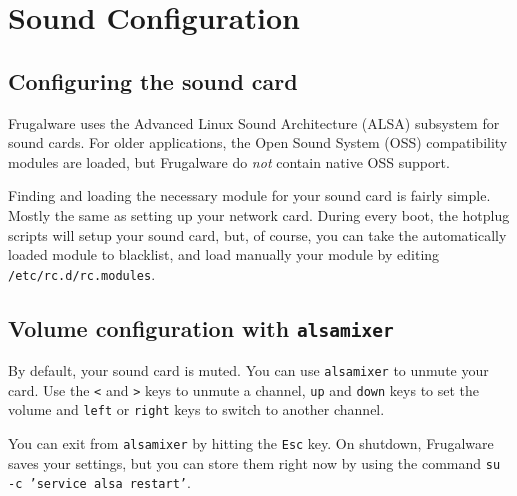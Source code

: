 \chapter{Sound Configuration}
\section{Configuring the sound card}

Frugalware uses the Advanced Linux Sound Architecture (ALSA) subsystem for sound cards. For older applications, the Open Sound System (OSS) compatibility modules are loaded, but Frugalware do \textit{not} contain native OSS support.

Finding and loading the necessary module for your sound card is fairly simple. Mostly the same as setting up your network card. During every boot, the hotplug scripts will setup your sound card, but, of course, you can take the automatically loaded module to blacklist, and load manually your module by editing {\tt /etc/rc.d/rc.modules}.

\section{Volume configuration with {\tt alsamixer}}

By default, your sound card is muted. You can use {\tt alsamixer} to unmute your card. Use the {\tt <} and {\tt >} keys to unmute a channel, {\tt up} and {\tt down} keys to set the volume and {\tt left} or {\tt right} keys to switch to another channel.

You can exit from {\tt alsamixer} by hitting the {\tt Esc} key. On shutdown, Frugalware saves your settings, but you can store them right now by using the command {\tt su -c 'service alsa restart'}.
